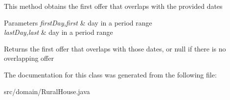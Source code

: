 This method obtains the first offer that overlaps with the provided dates


\begin{DoxyParams}{Parameters}
{\em first\+Day,first} & day in a period range \\
\hline
{\em last\+Day,last} & day in a period range \\
\hline
\end{DoxyParams}
\begin{DoxyReturn}{Returns}
the first offer that overlaps with those dates, or null if there is no overlapping offer 
\end{DoxyReturn}


The documentation for this class was generated from the following file\+:\begin{DoxyCompactItemize}
\item 
src/domain/Rural\+House.\+java\end{DoxyCompactItemize}
